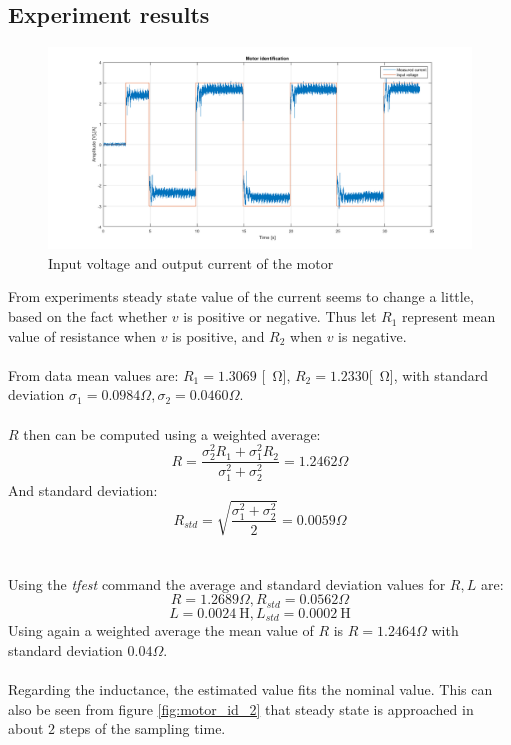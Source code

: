 \subsection{Experiment results}
\begin{figure}[!h]
    \centering
    \includegraphics[width=1\textwidth]{img/motor_id_1.png}
    \caption{Input voltage and output current of the motor}
    \label{fig:motor_id_1}
\end{figure}
From experiments steady state value of the current seems to change a little, based on the fact whether $v$ is positive or negative.
Thus let $R_1$ represent mean value of resistance when $v$ is positive, and $R_2$ when $v$ is negative.\\ \\
From data  mean values are: $R_1 =1.3069	$ [\SI{}{\ohm}], $R_2=1.2330$[\SI{}{\ohm}], with standard deviation $\sigma_1= 0.0984 \Omega, \sigma_2=0.0460 \Omega
$. \\ \\
$R$ then can be computed using a weighted average:
$$R = \frac{\sigma_2^2 R_1 + \sigma_1^2 R_2}{\sigma_1^2+\sigma_2^2} = 1.2462 \Omega$$
And standard deviation:
$$R_{std} = \sqrt{\frac{\sigma_1^2+\sigma_2^2}{2} }=0.0059 \Omega$$
\\ \\
Using the \emph{tfest} command the average and standard deviation values for $R,L$ are:
$$
R = 1.2689 \Omega, R_{std} = 0.0562 \Omega$$
$$
L = 0.0024 \SI{}{\henry}, L_{std} = 0.0002 \SI{}{\henry}$$
Using again a weighted average the mean value of $R$ is $R=1.2464 \Omega$ with standard deviation $0.04 \Omega$. \\ \\
Regarding the inductance, the estimated value fits the nominal value. This can also be seen from figure \ref{fig:motor_id_2} that  steady state is approached in about $2$ steps of the sampling time.\\
